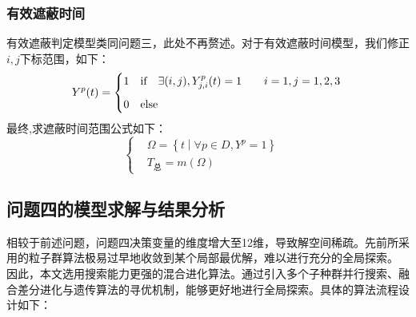 \documentclass[withoutpreface,bwprint]{cumcmthesis}
\numberwithin{equation}{section} %
\numberwithin{figure}{section} %
\numberwithin{table}{section}  %
\begin{document}
\vspace{-2em}
\subsubsection{有效遮蔽时间}
有效遮蔽判定模型类同问题三，此处不再赘述。对于有效遮蔽时间模型，我们修正$i,j$下标范围，如下：
\begin{equation}
Y^p(t)=\begin{cases}
    1& \text{if\quad}\exists (i,j) ,Y_{j,i}^p(t)=1\qquad i=1,j=1,2,3\\[1.5ex]
    0& \text{else  }
    \end{cases}\\
\end{equation}
最终,求遮蔽时间范围公式如下：
\begin{equation}
\left\{
\begin{aligned}
&\Omega =\left\{ t\middle| \forall p\in D,Y^{p}=1 \right\}\quad \\[0.6ex]
& T_{\text{总}}=m(\Omega)
\end{aligned}
\right.
\end{equation}

\subsection{问题四的模型求解与结果分析}
相较于前述问题，问题四决策变量的维度增大至12维，导致解空间稀疏。先前所采用的粒子群算法极易过早地收敛到某个局部最优解，难以进行充分的全局探索。
因此，本文选用搜索能力更强的混合进化算法。通过引入多个子种群并行搜索、融合差分进化与遗传算法的寻优机制，能够更好地进行全局探索。具体的算法流程设计如下：
\end{document}
